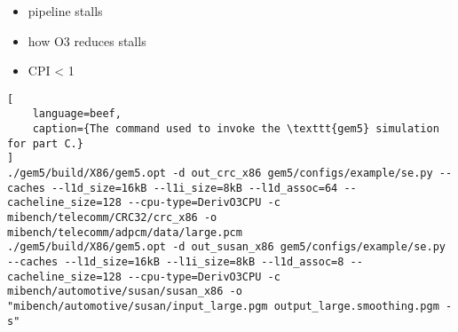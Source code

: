 
\begin{itemize}
\item pipeline stalls
\item how O3 reduces stalls
\item CPI < 1
\end{itemize}


\begin{lstlisting}[
    language=beef,
    caption={The command used to invoke the \texttt{gem5} simulation for part C.}
]
./gem5/build/X86/gem5.opt -d out_crc_x86 gem5/configs/example/se.py --caches --l1d_size=16kB --l1i_size=8kB --l1d_assoc=64 --cacheline_size=128 --cpu-type=DerivO3CPU -c mibench/telecomm/CRC32/crc_x86 -o mibench/telecomm/adpcm/data/large.pcm
./gem5/build/X86/gem5.opt -d out_susan_x86 gem5/configs/example/se.py --caches --l1d_size=16kB --l1i_size=8kB --l1d_assoc=8 --cacheline_size=128 --cpu-type=DerivO3CPU -c mibench/automotive/susan/susan_x86 -o "mibench/automotive/susan/input_large.pgm output_large.smoothing.pgm -s"
\end{lstlisting}
